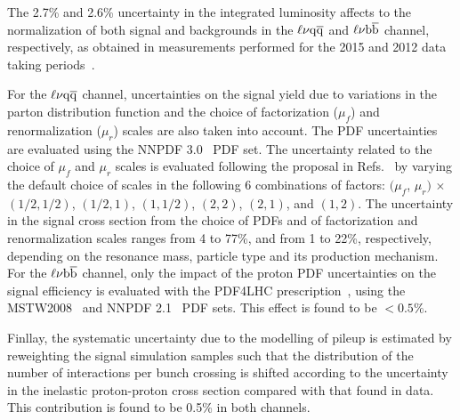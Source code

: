 The 2.7\% and 2.6\% uncertainty in the integrated luminosity affects to the normalization of both signal and backgrounds in the $\ell\nu\mathrm{q}\overline{\mathrm{q}}$ and $\ell\nu{\mathrm{b}\overline{\mathrm{b}}}$ channel, respectively, as obtained in measurements performed for the 2015 and 2012 data taking periods~\cite{CMS-PAS-LUM-15-001,CMS:LUM13001}. 

For the $\ell\nu\mathrm{q}\overline{\mathrm{q}}$ channel, uncertainties on the signal yield due to variations in the parton distribution function and the choice of factorization ($\mu_{f}$) and renormalization ($\mu_{r}$) scales are also taken into account.
The PDF uncertainties are evaluated using the NNPDF 3.0~\cite{Ball:2011mu} PDF set.
The uncertainty related to the choice of $\mu_{f}$ and $\mu_{r}$ scales is evaluated following the proposal in Refs.~\cite{Cacciari:2003fi,Catani:2003zt} by varying the default choice of scales in the following 6 combinations of factors:
$(\mu_{f}$, $\mu_{r})$ $\times$ $(1/2, 1/2)$, $(1/2, 1)$, $(1,1/2)$, $(2, 2)$, $(2, 1)$, and $(1, 2)$.
The uncertainty in the signal cross section from the choice of PDFs and of factorization and renormalization scales ranges from 4 to 77\%, and from 1 to 22\%, respectively, depending on the resonance mass, particle type and its production mechanism.
For the $\ell\nu{\mathrm{b}\overline{\mathrm{b}}}$ channel, only the impact of the proton PDF uncertainties on the signal efficiency is evaluated with the PDF4LHC prescription~\cite{Botje:2011sn,Alekhin:2011sk}, using the MSTW2008~\cite{MSTW} and NNPDF 2.1~\cite{NNPDF} PDF sets. This effect is found to be $< 0.5\%$.

Finllay, the systematic uncertainty due to the modelling of pileup is estimated by reweighting the signal simulation samples such that the distribution of the number of interactions per bunch crossing is shifted according to the uncertainty in the inelastic proton-proton cross section compared with that found in data. This contribution is found to be 0.5\% in both channels.

